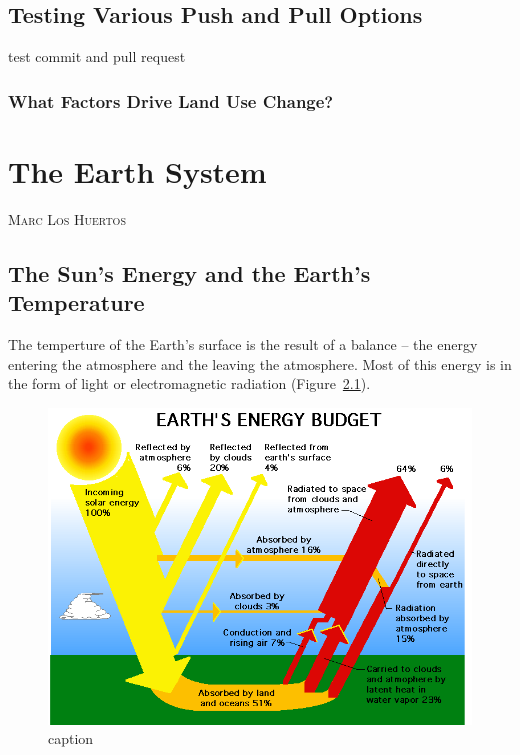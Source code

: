 \documentclass{book}\usepackage{knitr}
\makeatletter
\newcommand{\chapterauthor}[1]{%
  {\parindent0pt\vspace*{-25pt}%
  \linespread{1.1}\large\scshape#1%
  \par\nobreak\vspace*{35pt}}
  \@afterheading%
}
\makeatother
\begin{document}
\begin{knitrout}
\begin{kframe}
\section{Testing Various Push and Pull Options}

test commit and pull request 


\subsection{What Factors Drive Land Use Change?}





\mainmatter


\chapter{The Earth System}\label{earthsystem}

\chapterauthor{Marc Los Huertos}

\section{The Sun's Energy and the Earth's Temperature}

The temperture of the Earth's surface is the result of a balance -- the energy entering the atmosphere and the leaving the atmosphere. Most of this energy is in the form of light or electromagnetic radiation (Figure~\ref{fig:earthbudget}). 

\begin{figure}
\includegraphics[width=\linewidth]{images/earth-system/earth-rad-budget-nasa-erbe.png}
\caption{caption}
\label{fig:earthbudget}
\end{figure}


\end{kframe}
\end{knitrout}
\end{document}

